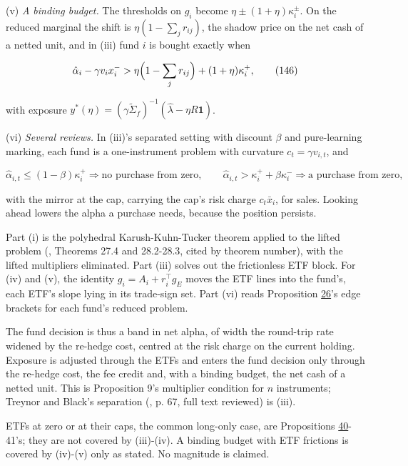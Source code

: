 \documentclass[11pt]{article}
\begin{document}
(v) \emph{A binding budget.} The thresholds on \(g_i\) become
\(\eta\pm(1+\eta)\kappa^\pm_i\). On the reduced marginal the shift is
\(\eta(1-\sum_jr_{ij})\), the shadow price on the net cash of a netted unit,
and in (iii) fund \(i\) is bought exactly when

\begin{equation*}
\hat\alpha_i-\gamma v_ix^-_i>\eta\Bigl(1-\sum_jr_{ij}\Bigr)+(1+\eta)\kappa^+_i,\tag{146}\label{eq:146}
\end{equation*}

with exposure \(y^*(\eta)=(\gamma\tilde\Sigma_f)^{-1}(\hat\lambda-\eta R\mathbf1)\).

(vi) \emph{Several reviews.} In (iii)'s separated setting with discount \(\beta\)
and pure-learning marking, each fund is a one-instrument problem with
curvature \(c_t=\gamma v_{i,t}\), and

\begin{equation*}
\hat\alpha_{i,t}\leq(1-\beta)\kappa^+_i\Rightarrow\text{no purchase from zero},\qquad
\hat\alpha_{i,t}>\kappa^+_i+\beta\kappa^-_i\Rightarrow\text{a purchase from zero},\tag{147}\label{eq:147}
\end{equation*}

with the mirror at the cap, carrying the cap's risk charge
\(c_t\bar x_i\), for sales. Looking ahead lowers the alpha a purchase needs,
because the position persists.

Part (i) is the polyhedral Karush-Kuhn-Tucker theorem applied to the
lifted problem (\cite{rockafellar1970convex}, Theorems 27.4 and 28.2-28.3,
cited by theorem number), with the lifted multipliers eliminated.
Part (iii) solves out the frictionless ETF block. For (iv) and (v), the
identity \(g_i=A_i+r_i^\top g_E\) moves the ETF lines into the fund's, each
ETF's slope lying in its trade-sign set. Part (vi) reads Proposition \hyperref[res:Proposition-26]{26}'s
edge brackets for each fund's reduced problem.

The fund decision is thus a band in net alpha, of width the round-trip
rate widened by the re-hedge cost, centred at the risk charge on the
current holding. Exposure is adjusted through the ETFs and enters the
fund decision only through the re-hedge cost, the fee credit and, with
a binding budget, the net cash of a netted unit. This is Proposition
9's multiplier condition for \(n\) instruments; Treynor and Black's
separation (\cite{treynor1973security}, p. 67, full text reviewed) is (iii).

ETFs at zero or at their caps, the common long-only case, are
Propositions \hyperref[res:Proposition-40]{40}-41's; they are not covered by (iii)-(iv). A binding
budget with ETF frictions is covered by (iv)-(v) only as stated. No
magnitude is claimed.
\end{document}
